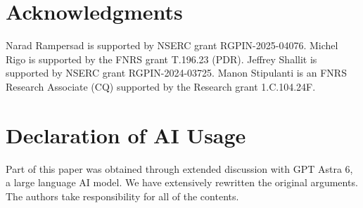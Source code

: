 \documentclass[12pt]{article}
\theoremstyle{plain}
\theoremstyle{definition}
\theoremstyle{remark}
\numberwithin{equation}{section}
\begin{document}
\section*{Acknowledgments}
Narad Rampersad is supported by NSERC grant RGPIN-2025-04076.
Michel Rigo is supported by the FNRS grant T.196.23 (PDR). 
Jeffrey Shallit is supported by NSERC grant RGPIN-2024-03725.
Manon Stipulanti is an FNRS Research Associate (CQ) supported by the Research grant 1.C.104.24F. 



\section*{Declaration of AI Usage}

Part of this paper was obtained through extended discussion with GPT Astra 6, a large language AI model.
We have extensively rewritten the original arguments.  The authors take responsibility for all of the contents.





\end{document}
